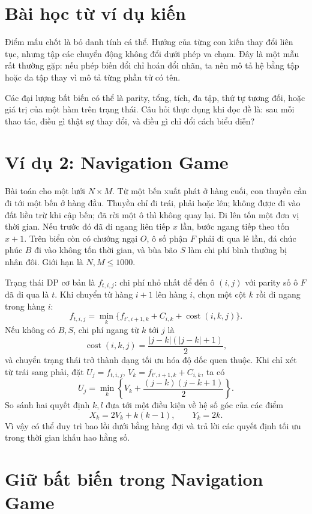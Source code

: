\documentclass[11pt]{article}
\newcommand{\cost}{\operatorname{cost}}
\begin{document}
\section{Bài học từ ví dụ kiến}

Điểm mấu chốt là bỏ danh tính cá thể. Hướng của từng con kiến thay đổi liên
tục, nhưng tập các chuyển động không đổi dưới phép va chạm. Đây là một mẫu
rất thường gặp: nếu phép biến đổi chỉ hoán đổi nhãn, ta nên mô tả hệ bằng
tập hoặc đa tập thay vì mô tả từng phần tử có tên.

Các đại lượng bất biến có thể là parity, tổng, tích, đa tập, thứ tự tương
đối, hoặc giá trị của một hàm trên trạng thái. Câu hỏi thực dụng khi đọc đề
là: sau mỗi thao tác, điều gì thật sự thay đổi, và điều gì chỉ đổi cách biểu
diễn?

\section{Ví dụ 2: Navigation Game}

Bài toán cho một lưới \(N\times M\). Từ một bến xuất phát ở hàng cuối, con
thuyền cần đi tới một bến ở hàng đầu. Thuyền chỉ đi trái, phải hoặc lên; không
được đi vào đất liền trừ khi cập bến; đã rời một ô thì không quay lại. Đi lên
tốn một đơn vị thời gian. Nếu trước đó đã đi ngang liên tiếp \(x\) lần, bước
ngang tiếp theo tốn \(x+1\). Trên biển còn có chướng ngại \(O\), ô số phận
\(F\) phải đi qua lẻ lần, đá chúc phúc \(B\) đi vào không tốn thời gian, và
bùa bão \(S\) làm chi phí bình thường bị nhân đôi. Giới hạn là
\(N,M\le 1000\).

Trạng thái DP cơ bản là \(f_{t,i,j}\): chi phí nhỏ nhất để đến ô \((i,j)\)
với parity số ô \(F\) đã đi qua là \(t\). Khi chuyển từ hàng \(i+1\) lên hàng
\(i\), chọn một cột \(k\) rồi đi ngang trong hàng \(i\):
\[
  f_{t,i,j}=
  \min_k\{f_{t',i+1,k}+C_{i,k}+\cost(i,k,j)\}.
\]
Nếu không có \(B,S\), chi phí ngang từ \(k\) tới \(j\) là
\[
  \cost(i,k,j)=\frac{|j-k|(|j-k|+1)}2,
\]
và chuyển trạng thái trở thành dạng tối ưu hóa độ dốc quen thuộc. Khi chỉ xét
từ trái sang phải, đặt \(U_j=f_{t,i,j}\), \(V_k=f_{t',i+1,k}+C_{i,k}\), ta có
\[
  U_j=\min_k\left\{V_k+\frac{(j-k)(j-k+1)}2\right\}.
\]
So sánh hai quyết định \(k,l\) đưa tới một điều kiện về hệ số góc của các
điểm
\[
  X_k=2V_k+k(k-1),\qquad Y_k=2k.
\]
Vì vậy có thể duy trì bao lồi dưới bằng hàng đợi và trả lời các quyết định
tối ưu trong thời gian khấu hao hằng số.

\section{Giữ bất biến trong Navigation Game}
\end{document}

